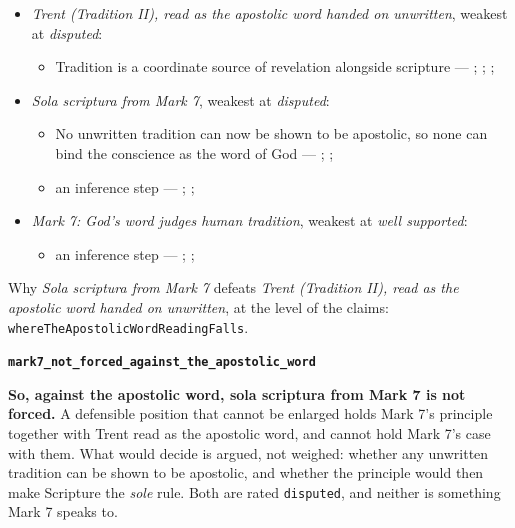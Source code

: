 \documentclass[11pt]{article}
\begin{document}
\begin{itemize}
\item \emph{Trent (Tradition II), read as the apostolic word handed on unwritten}, weakest at \emph{disputed}:
\begin{itemize}
\item Tradition is a coordinate source of revelation alongside scripture --- \cite[Trent, Session IV (1546), Decree on Sacred Books and Traditions]{tanner-decrees-1990}; \cite{mathison-shape-sola-scriptura-2001}; \cite{geiselmann-meaning-of-tradition-1966}; \cite{congar-tradition-and-traditions-1966}
\end{itemize}
\item \emph{Sola scriptura from Mark 7}, weakest at \emph{disputed}:
\begin{itemize}
\item No unwritten tradition can now be shown to be apostolic, so none can bind the conscience as the word of God --- \cite[503--511]{whitaker-disputation-1849}; \cite[594]{whitaker-disputation-1849}; \cite[I.6]{westminster-confession-1647}
\item an inference step --- \cite{geiselmann-meaning-of-tradition-1966}; \cite[Vatican I (1870), Pastor Aeternus, ch. 4]{tanner-decrees-1990}; \cite{florovsky-bible-church-tradition-1972}
\end{itemize}
\item \emph{Mark 7: God’s word judges human tradition}, weakest at \emph{well supported}:
\begin{itemize}
\item an inference step --- \cite[Vatican II (1965), Dei Verbum 10]{tanner-decrees-1990}; \cite[IV.x.23]{calvin-institutes-1960}; \cite[15--16]{wenham-our-lords-view-1953}
\end{itemize}
\end{itemize}
\noindent Why \emph{Sola scriptura from Mark 7} defeats \emph{Trent (Tradition II), read as the apostolic word handed on unwritten}, at the level of the claims: \texttt{where\allowbreak{}The\allowbreak{}Apostolic\allowbreak{}Word\allowbreak{}Reading\allowbreak{}Falls}.
\par\medskip\noindent\textbf{\texttt{mark7\_\allowbreak{}not\_\allowbreak{}forced\_\allowbreak{}against\_\allowbreak{}the\_\allowbreak{}apostolic\_\allowbreak{}word}}\par\nobreak\noindent
\textbf{So, against the apostolic word, sola scriptura from Mark 7 is not forced.} A defensible position that cannot be enlarged holds Mark 7’s principle together with Trent read as the apostolic word, and cannot hold Mark 7’s case with them. What would decide is argued, not weighed: whether any unwritten tradition can be shown to be apostolic, and whether the principle would then make Scripture the \emph{sole} rule. Both are rated \texttt{disputed}, and neither is something Mark 7 speaks to.
\end{document}
